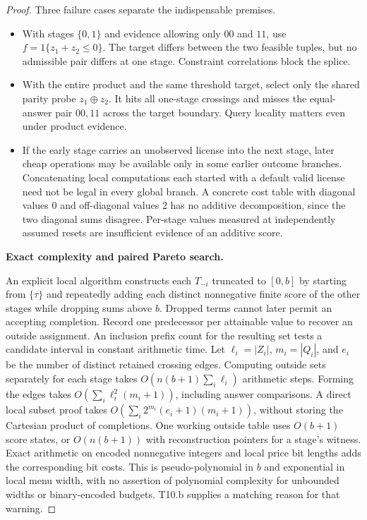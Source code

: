 \begin{proof}
Three failure cases separate the indispensable premises.

\begin{itemize}

\item
  With stages \(\{0,1\}\) and evidence allowing only \(00\) and \(11\), use \(f=1\{z_1+z_2\le0\}\). The target differs between the two feasible tuples, but no admissible pair differs at one stage. Constraint correlations block the splice.
\item
  With the entire product and the same threshold target, select only the shared parity probe \(z_1\oplus z_2\). It hits all one-stage crossings and misses the equal-answer pair \(00,11\) across the target boundary. Query locality matters even under product evidence.
\item
  If the early stage carries an unobserved license into the next stage, later cheap operations may be available only in some earlier outcome branches. Concatenating local computations each started with a default valid license need not be legal in every global branch. A concrete cost table with diagonal values 0 and off-diagonal values 2 has no additive decomposition, since the two diagonal sums disagree. Per-stage values measured at independently assumed resets are insufficient evidence of an additive score.
\end{itemize}

\textbf{Exact complexity and paired Pareto search.}

An explicit local algorithm constructs each \(T_{-i}\) truncated to \([0,b]\) by starting from \(\{\tau\}\) and repeatedly adding each distinct nonnegative finite score of the other stages while dropping sums above \(b\). Dropped terms cannot later permit an accepting completion. Record one predecessor per attainable value to recover an outside assignment. An inclusion prefix count for the resulting set tests a candidate interval in constant arithmetic time. Let \(\ell_i=|Z_i|\), \(m_i=|Q_i|\), and \(e_i\) be the number of distinct retained crossing edges. Computing outside sets separately for each stage takes \(O(n(b+1)\sum_i\ell_i)\) arithmetic steps. Forming the edges takes \(O(\sum_i\ell_i^2(m_i+1))\), including answer comparisons. A direct local subset proof takes \(O(\sum_i2^{m_i}(e_i+1)(m_i+1))\), without storing the Cartesian product of completions. One working outside table uses \(O(b+1)\) score states, or \(O(n(b+1))\) with reconstruction pointers for a stage's witness. Exact arithmetic on encoded nonnegative integers and local price bit lengths adds the corresponding bit costs. This is pseudo-polynomial in \(b\) and exponential in local menu width, with no assertion of polynomial complexity for unbounded widths or binary-encoded budgets. T10.b supplies a matching reason for that warning.


\end{proof}

